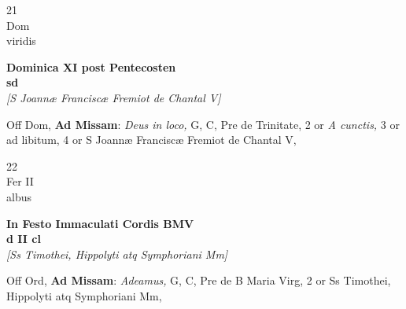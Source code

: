\documentclass[10pt, openany]{book}
\begin{document}
        \begin{center}
            \begin{minipage}{3.5in}
                \vspace{2em}
                \begin{minipage}{0.5in}
                    {\Huge 21} \\
                    {\normalsize Dom} \\
                    {\normalsize viridis}
                \end{minipage}
                \begin{minipage}{3.0in}
                    \textbf{ \large Dominica XI post Pentecosten \\
                    \textnormal{\normalsize sd}} \\ \textit{[S Joannæ Franciscæ Fremiot de Chantal V]} \\ 
                \end{minipage}
                \begin{justify}Off Dom, \textbf{Ad Missam}: \textit{Deus in loco,} G, C, Pre de Trinitate, 2 or \textit{A cunctis,} 3 or ad libitum, 4 or S Joannæ Franciscæ Fremiot de Chantal V,   
                \end{justify}
            \end{minipage}
        \end{center}
    
        \begin{center}
            \begin{minipage}{3.5in}
                \vspace{2em}
                \begin{minipage}{0.5in}
                    {\Huge 22} \\
                    {\normalsize Fer II} \\
                    {\normalsize albus}
                \end{minipage}
                \begin{minipage}{3.0in}
                    \textbf{ \large In Festo Immaculati Cordis BMV \\
                    \textnormal{\normalsize d II cl}} \\ \textit{[Ss Timothei, Hippolyti atq Symphoriani Mm]} \\ 
                \end{minipage}
                \begin{justify}Off Ord, \textbf{Ad Missam}: \textit{Adeamus,} G, C, Pre de B Maria Virg, 2 or Ss Timothei, Hippolyti atq Symphoriani Mm,   
                \end{justify}
            \end{minipage}
        \end{center}
    
\end{document}
